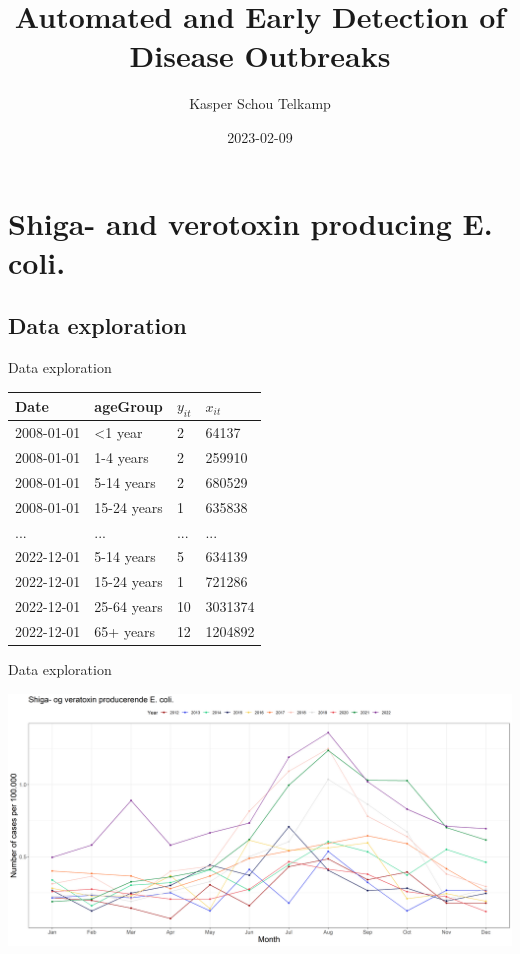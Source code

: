 \documentclass[aspectratio=169]{beamer}
\title[Automated and Early Detection of Disease Outbreaks]{Automated and
Early Detection of Disease Outbreaks}
\author{Kasper Schou Telkamp}
\institute{Section for Dynamical Systems}
\date{2023-02-09}
\begin{document}
\frame{
	\maketitle
}


\hypertarget{shiga--and-verotoxin-producing-e.-coli.}{%
\section{Shiga- and verotoxin producing E.
coli.}\label{shiga--and-verotoxin-producing-e.-coli.}}

\hypertarget{data-exploration}{%
\subsection{Data exploration}\label{data-exploration}}

\begin{frame}{Data exploration}
\tiny

\begin{table}
\centering\begingroup\fontsize{12}{14}\selectfont

\begin{tabular}{llll}
\toprule
Date & ageGroup & $y_{it}$ & $x_{it}$\\
\midrule
2008-01-01 & <1 year & 2 & 64137\\
2008-01-01 & 1-4 years & 2 & 259910\\
2008-01-01 & 5-14 years & 2 & 680529\\
2008-01-01 & 15-24 years & 1 & 635838\\
... & ... & ... & ...\\
2022-12-01 & 5-14 years & 5 & 634139\\
2022-12-01 & 15-24 years & 1 & 721286\\
2022-12-01 & 25-64 years & 10 & 3031374\\
2022-12-01 & 65+ years & 12 & 1204892\\
\bottomrule
\end{tabular}
\endgroup{}
\end{table}

\normalsize
\end{frame}

\begin{frame}{Data exploration}
\protect\hypertarget{data-exploration-1}{}
\tiny

\includegraphics[width=1\linewidth]{../figures/EpixSTEC}

\normalsize
\end{frame}
\end{document}
